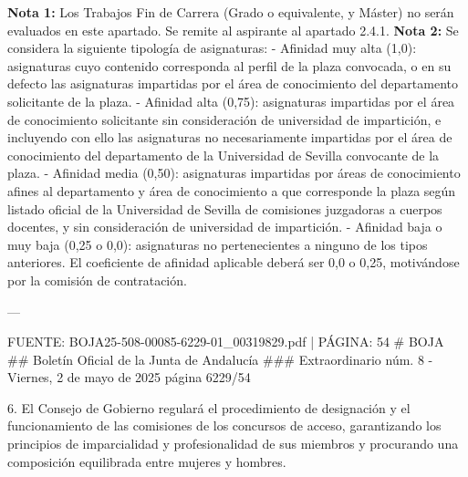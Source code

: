 \documentclass{article}
\begin{document}
\begin{itemize}
\begin{itemize}
\begin{scriptsize}
                  \textbf{Nota 1:} Los Trabajos Fin de Carrera (Grado o equivalente, y Máster) no serán evaluados en este apartado. Se remite al aspirante al apartado 2.4.1.
                  \textbf{Nota 2:} Se considera la siguiente tipología de asignaturas:
                  - Afinidad muy alta (1,0): asignaturas cuyo contenido corresponda al perfil de la plaza convocada, o en su defecto las asignaturas impartidas por el área de conocimiento del departamento solicitante de la plaza.
                  - Afinidad alta  (0,75): asignaturas impartidas por el área de conocimiento solicitante sin consideración de universidad de impartición, e incluyendo con ello las asignaturas no necesariamente impartidas por el área de conocimiento del departamento de la Universidad de Sevilla convocante de la plaza.
                  - Afinidad media  (0,50): asignaturas impartidas por áreas de conocimiento afines al departamento y área de conocimiento a que corresponde la plaza según listado oficial de la Universidad de Sevilla de comisiones juzgadoras a cuerpos docentes, y sin consideración de universidad de impartición.
                  - Afinidad baja o muy baja      (0,25 o 0,0): asignaturas no pertenecientes a ninguno de los tipos anteriores. El coeficiente de afinidad aplicable deberá ser 0,0 o 0,25, motivándose por la comisión de contratación.

                  ---

                  FUENTE: BOJA25-508-00085-6229-01\_00319829.pdf | PÁGINA: 54
                  \# BOJA
                  \#\# Boletín Oficial de la Junta de Andalucía
                  \#\#\# Extraordinario núm. 8 - Viernes, 2 de mayo de 2025
                  página 6229/54

                  6. El Consejo de Gobierno regulará el procedimiento de designación y el funcionamiento de las comisiones de los concursos de acceso, garantizando los principios de imparcialidad y profesionalidad de sus miembros y procurando una composición equilibrada entre mujeres y hombres.


\end{scriptsize}
\end{itemize}
\end{itemize}
\end{document}
